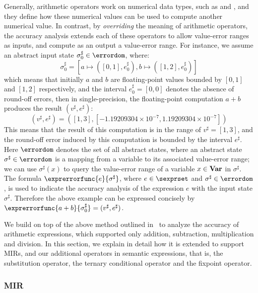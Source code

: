 Generally, arithmetic operators work on numerical data types, such as
\inttype{} and \floattype, and they define how these numerical values can be
used to compute another numerical value.  In contrast, by \emph{overriding}
the meaning of arithmetic operators, the accuracy analysis extends each of
these operators to allow value-error ranges as inputs, and compute as an
output a value-error range.  For instance, we assume an abstract input state
$\sigma^\sharp_0 \in \errordom$, where:
\begin{equation}
        \sigma^\sharp_0 = \left[
            a \mapsto ([0, 1], e^\sharp_0),
            b \mapsto ([1, 2], e^\sharp_0) \right]
\end{equation}
which means that initially
$a$ and $b$ are floating-point values bounded by $[0, 1]$ and $[1, 2]$
respectively, and the interval $e^\sharp_0 = [0, 0]$ denotes the absence of
round-off errors, then in single-precision, the floating-point computation $a
+ b$ produces the result $\left( v^\sharp, e^\sharp \right)$:
\begin{equation}
    \left( v^\sharp, e^\sharp \right) = \left(
        [1, 3], [-1.19209304 \times 10^{-7}, 1.19209304 \times 10^{-7}]
    \right)
\end{equation}
This means that the result of this computation is in the range of $v^\sharp =
[1, 3]$, and the round-off error induced by this computation is bounded by the
interval $e^\sharp$.  Here $\errordom$ denotes the set of all abstract states,
where an abstract state $\sigma^\sharp \in \errordom$ is a mapping from a
variable to its associated value-error range; we can use $\sigma^\sharp(x)$ to
query the value-error range of a variable $x \in \mathbf{Var}$ in $\sigma^\sharp$.
The formula $\exprerrorfunc{e}{\sigma^\sharp}$, where $e \in \sexprset$ and
$\sigma^\sharp \in \errordom$, is used to indicate the accuracy analysis of
the expression $e$ with the input state $\sigma^\sharp$.  Therefore the above
example can be expressed concisely by $\exprerrorfunc{a + b}{\sigma^\sharp_0} =
(v^\sharp, e^\sharp)$.

We build on top of the above method outlined in~\cite{soap} to analyze the
accuracy of arithmetic expressions, which supported only addition, subtraction,
multiplication and division.  In this section, we explain in detail how it is
extended to support MIRs, and our additional operators in semantic expressions,
that is, the substitution operator, the ternary conditional operator and the
fixpoint operator.

\subsubsection{MIR}

